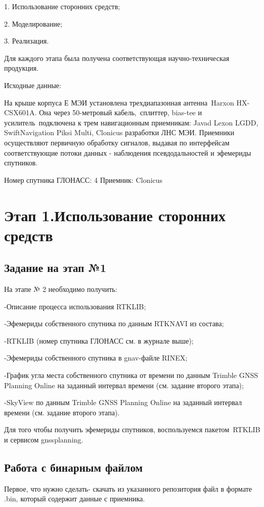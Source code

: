 \documentclass[]{article}
\begin{document}
	1. Использование сторонних средств;
	
	2. Моделирование;
	
	3. Реализация.
	
	Для каждого этапа была получена соответствующая научно-техническая продукция.
	
	Исходные данные: 
	
	На крыше корпуса Е МЭИ установлена трехдиапазонная антенна Harxon HX-CSX601A. Она через 50-метровый кабель, сплиттер, bias-tee и усилитель подключена к трем навигационным приемникам:
	Javad Lexon LGDD, SwiftNavigation Piksi Multi, Clonicus разработки ЛНС МЭИ.
	Приемники осуществляют первичную обработку сигналов, выдавая по интерфейсам соответствующие потоки данных - наблюдения псевдодальностей и эфемериды спутников. 
	
	Номер спутника ГЛОНАСС: 4
	Приемник: Clonicus
	\newpage
	
	\section{Этап 1.Использование сторонних средств}
	\subsection{Задание на этап №1}
	На этапе № 2 необходимо получить:
	
	-Описание процесса использования RTKLIB;
	
	-Эфемериды собственного спутника по данным RTKNAVI из состава;
	
	-RTKLIB (номер спутника ГЛОНАСС см. в журнале выше);
	
	-Эфемериды собственного спутника в gnav-файле RINEX;
	
	-График угла места собственного спутника от времени по данным Trimble GNSS Planning Online на заданный интервал времени (см. задание второго этапа);
	
	-SkyView по данным Trimble GNSS Planning Online на заданный интервал времени (см. задание второго этапа).
	
	Для того чтобы получить эфемериды спутников, воспользуемся пакетом RTKLIB и сервисом gnssplanning. 
	
	\subsection{Работа с  бинарным  файлом}
	Первое, что нужно сделать- скачать из указанного репозитория  файл в формате .bin, который содержит данные с приемника. 
\end{document}
